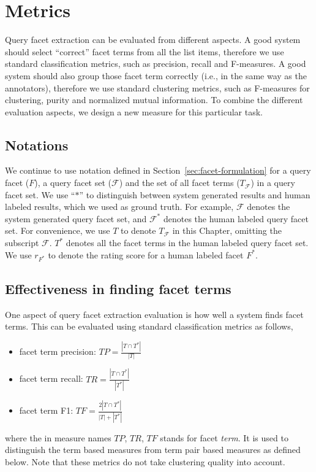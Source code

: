 \section{Metrics} 
\label{sec:ie-metrics}
Query facet extraction can be evaluated from different aspects. A good system should select ``correct'' facet terms from all the list items, therefore we use standard classification metrics, such as precision, recall and F-measures. A good system should also group those facet term correctly (i.e., in the same way as the annotators), therefore we use standard clustering metrics, such as F-measures for clustering, purity and normalized mutual information. To combine the different evaluation aspects, we design a new measure for this particular task.
\subsection{Notations} \label{sec:evalmetrics}
We continue to use notation defined in Section~\ref{sec:facet-formulation} for a query facet ($F$), a query facet set ($\mathcal{F}$) and the set of all facet terms ($T_{\mathcal{F}}$) in a query facet set. We use ``$*$'' to distinguish between system generated results and human labeled results, which we used as ground truth.
For example, $\mathcal{F}$ denotes the system generated query facet set, and $\mathcal{F}^*$ denotes the human labeled query facet set.
For convenience, we use $T$ to denote $T_{\mathcal{F}}$ in this Chapter, omitting the subscript $\mathcal{F}$.
$T^*$ denotes all the facet terms in the human labeled query facet set.
We use $r_{F^*}$ to denote the rating score for a human labeled facet $F^*$.

\subsection{Effectiveness in finding facet terms}
\label{sec:intrinsic-tmeasures}
One aspect of query facet extraction evaluation is how well a system finds facet terms. This can be evaluated using standard classification metrics as follows,
\begin{itemize}
 \item facet term precision: $T\!P=\frac{|T \cap T^*|}{|T|}$
 \item facet term recall: $T\!R=\frac{|T \cap T^*|}{|T^*|}$
 \item facet term F1: $T\!F=\frac{2|T \cap T^*|}{|T|+|T^*|}$
\end{itemize}
where the  in measure names $T\!P$, $T\!R$, $T\!F$ stands for facet \emph{term}. It is used to distinguish the term based measures from term pair based measures as defined below. Note that these metrics do not take clustering quality into account.

